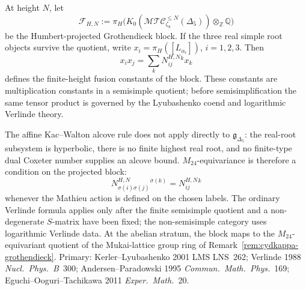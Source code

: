 \begin{remark}
\label{rem:cydkappa-fusion-ring}
At height \(N\), let
\[
\mathcal F_{H,N}:=
\pi_H\bigl(K_0(\mathcal{MTC}^{\leq N}_{\zeta_8}(\Delta_5))
\otimes_{\mathbb Z}\mathbb Q\bigr)
\]
be the Humbert-projected Grothendieck block. If the three real simple
root objects survive the quotient, write
\(x_i=\pi_H([L_{\alpha_i}])\), \(i=1,2,3\). Then
\[
x_i x_j=\sum_k N^{H,N}_{ij}{}^k x_k
\]
defines the finite-height fusion constants of the block. These
constants are multiplication constants in a semisimple quotient; before
semisimplification the same tensor product is governed by the
Lyubashenko coend and logarithmic Verlinde theory.

The affine Kac--Walton alcove rule does not apply directly to
\(\mathfrak g_{\Delta_5}\): the real-root subsystem is hyperbolic,
there is no finite highest real root, and no finite-type dual Coxeter
number supplies an alcove bound. \(M_{24}\)-equivariance is therefore a
condition on the projected block:
\[
N^{H,N}_{\sigma(i)\sigma(j)}{}^{\sigma(k)}
=N^{H,N}_{ij}{}^k
\]
whenever the Mathieu action is defined on the chosen labels. The
ordinary Verlinde formula applies only after the finite semisimple
quotient and a non-degenerate \(S\)-matrix have been fixed; the
non-semisimple category uses logarithmic Verlinde data. At the abelian
stratum, the block maps to the \(M_{24}\)-equivariant quotient of the
Mukai-lattice group ring of
Remark~\ref{rem:cydkappa-grothendieck}.
Primary: Kerler--Lyubashenko 2001 LMS LNS~262; Verlinde 1988
\emph{Nucl.~Phys.~B}~300; Andersen--Paradowski 1995
\emph{Commun.~Math.~Phys.}~169; Eguchi--Ooguri--Tachikawa 2011
\emph{Exper.~Math.}~20.
\end{remark}

